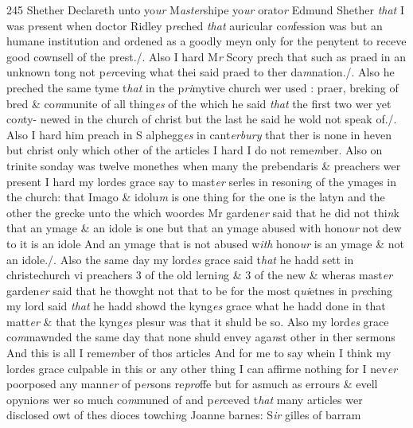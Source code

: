 \documentclass[12pt, a4paper]{book}
\begin{document}
{\color{Mahogany}245} Shether Declareth unto yo\textit{ur} M\textit{aster}shipe yo\textit{ur} orato\textit{r} Edmund Shether \textit{that} I was p\textit{re}sent when doctor Ridley p\textit{re}ched \textit{that} auricular co\textit{n}fession was but an humane institution and ordened as a goodly meyn only for the penytent to  receve good cownsell of the prest./. Also I hard M\textit{r }Scory prech that such as praed in an unknown tong not p\textit{er}ceving what thei said praed to ther da\textit{m}nation./. Also he preched the same tyme t\textit{hat} in the  p\textit{ri}mytive church wer used : praer, breking of bred \& co\textit{m}munite  of all thing\textit{es} of the which he said \textit{that} the first two wer yet co\textit{n}ty- newed in the church of christ but the last he said he wold not  speak of./. Also I hard him preach in S alphegg\textit{es} in cant\textit{erbury} that ther is none in heven but christ only which other of the articles I hard I do not reme\textit{m}ber. Also on trinite sonday was twelve monethes when many the prebendaris \& preachers wer present I hard my lordes grace say to mast\textit{er} serles in resoni\textit{n}g of the ymages in the church: that  Imago \& idolu\textit{m} is one thing for the one is the latyn and the other the grecke unto the which woordes Mr garden\textit{er} said that he did not thi\textit{n}k that an ymage \& an idole is one but that an ymage abused with  hono\textit{ur} not dew to it is an idole And an ymage that is not abused  w\textit{ith} hono\textit{ur} is an ymage \& not an idole./.  Also the same day my lord\textit{es} grace said t\textit{hat} he hadd sett in christechurch vi preachers 3 of the old lerni\textit{n}g \& 3 of the new \& wheras mast\textit{er} garden\textit{er} said that he thowght not that to be for the most q\textit{ui}etnes in  p\textit{re}ching my lord said \textit{that} he hadd showd the kyng\textit{es} grace what he hadd  done in that matt\textit{er} \& that the kyng\textit{es} plesur was that it shuld be  so. Also my lord\textit{es} grace co\textit{m}mawnded the same day that none
			 shuld envey aga\textit{n}st other in ther sermons And this is all I reme\textit{m}ber of thos articles 
				\marginpar[\vspace{0.5cm}{\textcolor{Gray}{n}}]{}
			 And for me to say whein I think my lordes grace culpable in this  or any other thing I can affirme nothing for I nev\textit{er} poorposed any mann\textit{er} of p\textit{er}sons re\textit{pro}ffe but for asmuch as errours \& evell opynio\textit{n}s wer so much co\textit{m}muned of and p\textit{er}ceved t\textit{hat} many articles wer disclosed owt of thes dioces towchi\textit{n}g Joanne barnes: S\textit{ir} gilles of barram 
\end{document}
